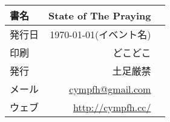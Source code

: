 \begin{titlepage}

    \vspace*{\fill}

    \begin{tabular}{lrr} \toprule
        {◼️} 書名 & State of The Praying \\ \midrule
        {◼️} 発行日 & \today (イベント名) \\ \midrule
        {◼️} 印刷 & どこどこ \\ \midrule
        {◼️} 発行 & 土足厳禁 \\ \midrule
        {📧} メール &  \url{cympfh@gmail.com} \\
        {🌐} ウェブ & \url{http://cympfh.cc/} \\
        \bottomrule
    \end{tabular}

    \thispagestyle{empty}
\end{titlepage}
